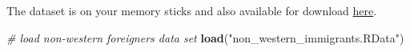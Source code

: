 \documentclass[]{article}
\newenvironment{Shaded}{\begin{snugshade}}{\end{snugshade}}
\newcommand{\CommentTok}[1]{\textcolor[rgb]{0.56,0.35,0.01}{\textit{#1}}}
\newcommand{\KeywordTok}[1]{\textcolor[rgb]{0.13,0.29,0.53}{\textbf{#1}}}
\newcommand{\NormalTok}[1]{#1}
\newcommand{\StringTok}[1]{\textcolor[rgb]{0.31,0.60,0.02}{#1}}
\begin{document}
The dataset is on your memory sticks and also available for download \href{http://philippbroniecki.github.io/ML2017.io/data/BSAS_manip.RData}{here}.

\begin{Shaded}
\begin{Highlighting}[]
\CommentTok{# load non-western foreigners data set}
\KeywordTok{load}\NormalTok{(}\StringTok{"non_western_immigrants.RData"}\NormalTok{)}
\end{Highlighting}
\end{Shaded}
\end{document}
